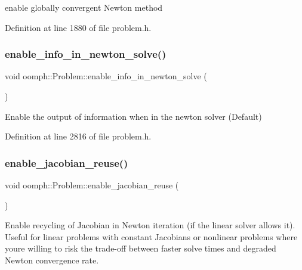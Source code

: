 enable globally convergent Newton method 



Definition at line 1880 of file problem.\+h.

\mbox{\label{classoomph_1_1Problem_a3226bf49118c8a4f02dbe01d22428f20}} 
\subsubsection{\texorpdfstring{enable\+\_\+info\+\_\+in\+\_\+newton\+\_\+solve()}{enable\_info\_in\_newton\_solve()}}
{\footnotesize\ttfamily void oomph\+::\+Problem\+::enable\+\_\+info\+\_\+in\+\_\+newton\+\_\+solve (\begin{DoxyParamCaption}{ }\end{DoxyParamCaption})\hspace{0.3cm}{\ttfamily [inline]}}



Enable the output of information when in the newton solver (Default) 



Definition at line 2816 of file problem.\+h.

\mbox{\label{classoomph_1_1Problem_a8eb2fedc3f64411cfbe1627a516447f9}} 
\subsubsection{\texorpdfstring{enable\+\_\+jacobian\+\_\+reuse()}{enable\_jacobian\_reuse()}}
{\footnotesize\ttfamily void oomph\+::\+Problem\+::enable\+\_\+jacobian\+\_\+reuse (\begin{DoxyParamCaption}{ }\end{DoxyParamCaption})\hspace{0.3cm}{\ttfamily [inline]}}



Enable recycling of Jacobian in Newton iteration (if the linear solver allows it). Useful for linear problems with constant Jacobians or nonlinear problems where you\textquotesingle{}re willing to risk the trade-\/off between faster solve times and degraded Newton convergence rate. 



